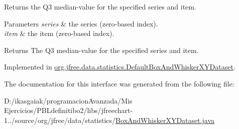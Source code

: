 Returns the Q3 median-\/value for the specified series and item.


\begin{DoxyParams}{Parameters}
{\em series} & the series (zero-\/based index). \\
\hline
{\em item} & the item (zero-\/based index).\\
\hline
\end{DoxyParams}
\begin{DoxyReturn}{Returns}
The Q3 median-\/value for the specified series and item. 
\end{DoxyReturn}


Implemented in \mbox{\hyperlink{classorg_1_1jfree_1_1data_1_1statistics_1_1_default_box_and_whisker_x_y_dataset_a02e36cd7245601a5bb665c36f953a27a}{org.\+jfree.\+data.\+statistics.\+Default\+Box\+And\+Whisker\+X\+Y\+Dataset}}.



The documentation for this interface was generated from the following file\+:\begin{DoxyCompactItemize}
\item 
D\+:/ikasgaiak/programacion\+Avanzada/\+Mis Ejercicios/\+P\+B\+Ldefinitibo2/libs/jfreechart-\/1../source/org/jfree/data/statistics/\mbox{\hyperlink{_box_and_whisker_x_y_dataset_8java}{Box\+And\+Whisker\+X\+Y\+Dataset.\+java}}\end{DoxyCompactItemize}

